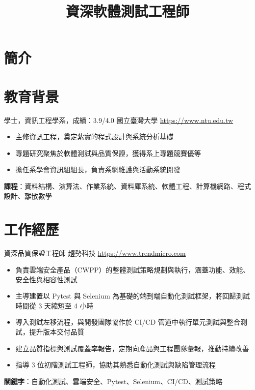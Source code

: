\documentclass[a4paper, serif, 10pt]{moderncv}
\title{資深軟體測試工程師}
\begin{document}
\maketitle

\section{簡介}

\section{教育背景}

        {學士，資訊工程學系，成績：3.9/4.0}
        {國立臺灣大學}
        {\url{https://www.ntu.edu.tw}}
        {}
        {\begin{itemize}
\item 主修資訊工程，奠定紮實的程式設計與系統分析基礎
\item 專題研究聚焦於軟體測試與品質保證，獲得系上專題競賽優等
\item 擔任系學會資訊組組長，負責系網維護與活動系統開發
\end{itemize}
\textbf{課程}：資料結構、演算法、作業系統、資料庫系統、軟體工程、計算機網路、程式設計、離散數學}
\section{工作經歷}

        {資深品質保證工程師}
        {趨勢科技}
        {\url{https://www.trendmicro.com}}
        {}
        {\begin{itemize}
\item 負責雲端安全產品（CWPP）的整體測試策略規劃與執行，涵蓋功能、效能、安全性與相容性測試
\item 主導建置以 Pytest 與 Selenium 為基礎的端到端自動化測試框架，將回歸測試時間從 3 天縮短至 4 小時
\item 導入測試左移流程，與開發團隊協作於 CI/CD 管道中執行單元測試與整合測試，提升版本交付品質
\item 建立品質指標與測試覆蓋率報告，定期向產品與工程團隊彙報，推動持續改善
\item 指導 3 位初階測試工程師，協助其熟悉自動化測試與缺陷管理流程
\end{itemize}
\textbf{關鍵字}：自動化測試、雲端安全、Pytest、Selenium、CI/CD、測試策略}
\end{document}
